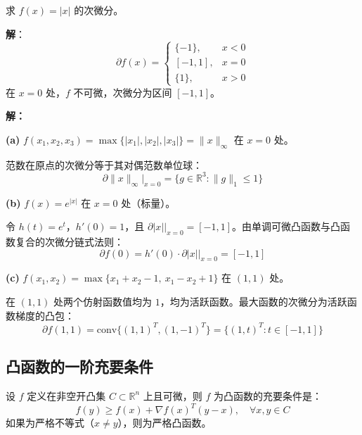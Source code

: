 \begin{example}[次梯度计算]
求 $f(x) = |x|$ 的次微分。

\textbf{解}：
\[
\partial f(x) = \begin{cases}
\{-1\}, & x < 0 \\[4pt]
[-1, 1], & x = 0 \\[4pt]
\{1\}, & x > 0
\end{cases}
\]
在 $x = 0$ 处，$f$ 不可微，次微分为区间 $[-1, 1]$。
\end{example}

\begin{example}[更多次微分计算]\label{ex:subdiff-more}
\textbf{解：}

\textbf{(a)} $f(x_1, x_2, x_3) = \max\{|x_1|, |x_2|, |x_3|\} = \|x\|_\infty$ 在 $x = 0$ 处。

范数在原点的次微分等于其对偶范数单位球：
\[
\partial \|x\|_\infty \big|_{x=0} = \{g \in \mathbb{R}^3 : \|g\|_1 \leq 1\}
\]

\textbf{(b)} $f(x) = e^{|x|}$ 在 $x = 0$ 处（标量）。

令 $h(t) = e^t$，$h'(0) = 1$，且 $\partial |x|\big|_{x=0} = [-1, 1]$。由单调可微凸函数与凸函数复合的次微分链式法则：
\[
\partial f(0) = h'(0) \cdot \partial |x|\big|_{x=0} = [-1, 1]
\]

\textbf{(c)} $f(x_1, x_2) = \max\{x_1 + x_2 - 1,\ x_1 - x_2 + 1\}$ 在 $(1, 1)$ 处。

在 $(1, 1)$ 处两个仿射函数值均为 $1$，均为活跃函数。最大函数的次微分为活跃函数梯度的凸包：
\[
\partial f(1, 1) = \text{conv}\{(1, 1)^T, (1, -1)^T\} = \{(1, t)^T : t \in [-1, 1]\}
\]
\end{example}

\subsection{凸函数的一阶充要条件}

\begin{theorem}[凸函数的一阶充要条件]\label{thm:convex-first-order}
设 $f$ 定义在非空开凸集 $C \subset \mathbb{R}^n$ 上且可微，则 $f$ 为凸函数的充要条件是：
\[
f(y) \geq f(x) + \nabla f(x)^T(y - x),\quad \forall x, y \in C
\]
如果为严格不等式（$x \neq y$），则为严格凸函数。
\end{theorem}

